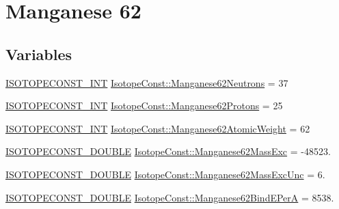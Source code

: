 \hypertarget{group___isotope_const-_manganese-_mn62}{}\section{Manganese 62}
\label{group___isotope_const-_manganese-_mn62}
\subsection*{Variables}
\begin{DoxyCompactItemize}
\item 
\mbox{\hyperlink{group___isotope_const-_macros_ga5f18360b3e99483a35c32d789e62621c}{I\+S\+O\+T\+O\+P\+E\+C\+O\+N\+S\+T\+\_\+\+I\+NT}} \mbox{\hyperlink{group___isotope_const-_manganese-_mn62_ga1d2365f776e2204d8257b6edc262ae81}{Isotope\+Const\+::\+Manganese62\+Neutrons}} = 37
\item 
\mbox{\hyperlink{group___isotope_const-_macros_ga5f18360b3e99483a35c32d789e62621c}{I\+S\+O\+T\+O\+P\+E\+C\+O\+N\+S\+T\+\_\+\+I\+NT}} \mbox{\hyperlink{group___isotope_const-_manganese-_mn62_ga8e56ee0c1d77f7edb5bb0c2447dd150e}{Isotope\+Const\+::\+Manganese62\+Protons}} = 25
\item 
\mbox{\hyperlink{group___isotope_const-_macros_ga5f18360b3e99483a35c32d789e62621c}{I\+S\+O\+T\+O\+P\+E\+C\+O\+N\+S\+T\+\_\+\+I\+NT}} \mbox{\hyperlink{group___isotope_const-_manganese-_mn62_gab0648168cde6733fc18ffc9f56ce4166}{Isotope\+Const\+::\+Manganese62\+Atomic\+Weight}} = 62
\item 
\mbox{\hyperlink{group___isotope_const-_macros_ga8f45a7272ce02c0b4c65c44636ed719a}{I\+S\+O\+T\+O\+P\+E\+C\+O\+N\+S\+T\+\_\+\+D\+O\+U\+B\+LE}} \mbox{\hyperlink{group___isotope_const-_manganese-_mn62_gadd9f73fb200f2b2ec9dbe6ab3be325e0}{Isotope\+Const\+::\+Manganese62\+Mass\+Exc}} = -\/48523.
\item 
\mbox{\hyperlink{group___isotope_const-_macros_ga8f45a7272ce02c0b4c65c44636ed719a}{I\+S\+O\+T\+O\+P\+E\+C\+O\+N\+S\+T\+\_\+\+D\+O\+U\+B\+LE}} \mbox{\hyperlink{group___isotope_const-_manganese-_mn62_ga1beacc948cee357fdd10d5d00f3a140e}{Isotope\+Const\+::\+Manganese62\+Mass\+Exc\+Unc}} = 6.
\item 
\mbox{\hyperlink{group___isotope_const-_macros_ga8f45a7272ce02c0b4c65c44636ed719a}{I\+S\+O\+T\+O\+P\+E\+C\+O\+N\+S\+T\+\_\+\+D\+O\+U\+B\+LE}} \mbox{\hyperlink{group___isotope_const-_manganese-_mn62_ga562ef93133a7f80b43305223d0fb5f0a}{Isotope\+Const\+::\+Manganese62\+Bind\+E\+PerA}} = 8538.
\item 

\end{DoxyCompactItemize}
